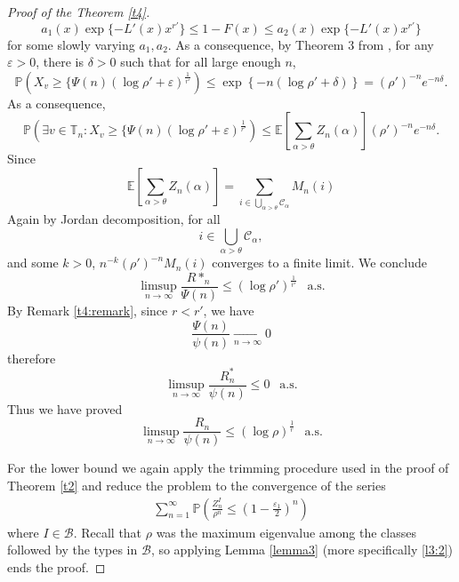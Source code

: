 \documentclass[12pt]{article}
\numberwithin{equation}{section}
\begin{document}
\begin{proof}[Proof of the Theorem \ref{t4}]
    \[
      a_1(x)\exp\{-L'(x)x^{r'}\} \leq1-F(x) \leq a_2(x)\exp\{-L'(x)x^{r'}\} 
    \] 
    for some slowly varying $a_1, a_2$. As a consequence, by Theorem 3 from \cite{Gantert2000}, for any $\varepsilon > 0$, there is $\delta >0 $ such that for all large enough $n$,
    \begin{equation}
        \mathbb{P}\left(X_v \geq \{\Psi(n) (\log \rho' + \varepsilon)^{\frac 1 {r'}}\right) \leq \exp \left\{ -n(\log \rho' + \delta) \right\} = (\rho')^{-n} e^{ -n \delta}.
    \end{equation}
    As a consequence,
    \[ \mathbb{P}\left(\exists v \in \mathbb{T}_n : X_v \geq \{\Psi(n) (\log \rho' + \varepsilon)^{\frac 1 {r'}}\right) \leq \mathbb{E}\left[\sum_{\alpha > \theta} Z_n(\alpha)\right] (\rho')^{-n} e^{ -n \delta}.
    \]
Since  \[\mathbb{E}\left[\sum_{\alpha > \theta} Z_n(\alpha)\right] = \sum_{i \in \bigcup_{\alpha > \theta} \mathcal{C}_\alpha} M_n(i) \]
Again by Jordan decomposition, for all \[i \in \bigcup_{\alpha > \theta} \mathcal{C}_\alpha,\]
and some $k>0$,
$n^{-k} (\rho')^{-n}M_n(i)$ converges to a finite limit. We conclude
\[
\limsup_{n \rightarrow \infty} \frac{R*_n}{\Psi(n)} \leq \left(\log \rho'\right)^{\frac 1 {r'}}\ \ \text{ a.s.}
\]
By Remark \ref{t4:remark}, since $r<r'$, we have
\[
\frac {\Psi(n)} {\psi(n)} \xrightarrow[n\rightarrow \infty]{} 0
\]
therefore
\begin{equation}\label{t4:eq3}
    \limsup_{n \rightarrow \infty} \frac {R^*_n} {\psi(n)} \leq 0\ \ \text{ a.s.}
\end{equation}
Thus we have proved
\[
    \limsup_{n \rightarrow \infty} \frac {R_n} {\psi(n)} \leq \left(\log \rho\right)^{\frac 1 {r}}\ \ \text{ a.s.}
\]

For the lower bound we again apply the trimming procedure used in the proof of Theorem \ref{t2} and reduce the problem to the convergence of the series 
    \begin{align*}\label{sum}
        \sum_{n=1}^\infty \mathbb{P}\left(\frac {Z^{I}_n} {\rho^n} \leq \left(1-\frac {\varepsilon_1} 2\right)^n \right) 
    \end{align*}
where $I \in \mathcal{B}$. Recall that $\rho$ was the maximum eigenvalue among the classes followed by the types in $\mathcal{B}$, so applying Lemma \ref{lemma3} (more specifically \eqref{l3:2}) ends the proof.

\end{proof}
\end{document}
